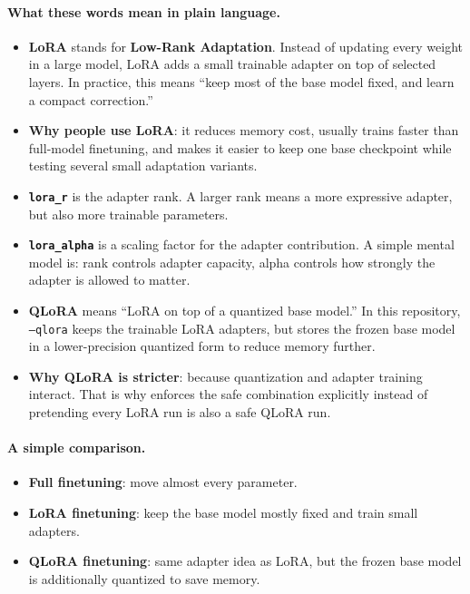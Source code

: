 \paragraph{What these words mean in plain language.}
\begin{itemize}
  \item \textbf{LoRA} stands for \textbf{Low-Rank Adaptation}. Instead of updating every weight in a large model, LoRA adds a small trainable adapter on top of selected layers. In practice, this means ``keep most of the base model fixed, and learn a compact correction.''
  \item \textbf{Why people use LoRA}: it reduces memory cost, usually trains faster than full-model finetuning, and makes it easier to keep one base checkpoint while testing several small adaptation variants.
  \item \textbf{\texttt{lora\_r}} is the adapter rank. A larger rank means a more expressive adapter, but also more trainable parameters.
  \item \textbf{\texttt{lora\_alpha}} is a scaling factor for the adapter contribution. A simple mental model is: rank controls adapter capacity, alpha controls how strongly the adapter is allowed to matter.
  \item \textbf{QLoRA} means ``LoRA on top of a quantized base model.'' In this repository, \texttt{--qlora} keeps the trainable LoRA adapters, but stores the frozen base model in a lower-precision quantized form to reduce memory further.
  \item \textbf{Why QLoRA is stricter}: because quantization and adapter training interact. That is why \yolozu{} enforces the safe combination explicitly instead of pretending every LoRA run is also a safe QLoRA run.
\end{itemize}

\paragraph{A simple comparison.}
\begin{itemize}
  \item \textbf{Full finetuning}: move almost every parameter.
  \item \textbf{LoRA finetuning}: keep the base model mostly fixed and train small adapters.
  \item \textbf{QLoRA finetuning}: same adapter idea as LoRA, but the frozen base model is additionally quantized to save memory.
\end{itemize}

